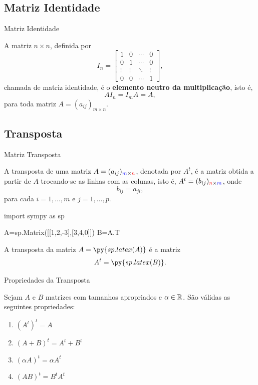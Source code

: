 \subsection*{Matriz Identidade}
\begin{frame}[label=matrizes]{Matriz Identidade}

A matriz $n\times n$, definida por
\[I_n=\begin{bmatrix}
1 & 0 & \cdots & 0\\
0 & 1 & \cdots & 0\\
\vdots & \vdots & \ddots & \vdots\\
0 & 0 & \cdots & 1
\end{bmatrix},\]
chamada de {\color{blue} matriz identidade}, é o \textbf{elemento neutro da multiplicação}, isto é, 
\[AI_n=I_mA=A,\]
para toda matriz $A=(a_{ij})_{m\times n}$.
\end{frame}

\subsection*{Transposta}
\begin{frame}[label=matrizes,fragile=singleslide]{Matriz Transposta}

A {\color{blue} transposta} de uma matriz $A=(a_{ij})_{{\color{blue}m}\times {\color{red}n}}$, denotada por $A^t$,  é a matriz obtida a partir de $A$ trocando-se as linhas com as colunas, isto é,  $A^t=(b_{ij})_{{\color{red}n}\times {\color{blue}m}}$, onde
\[b_{ij}=a_{ji},\]
para cada $i=1,\ldots,m$ e $j=1,\ldots,p$.


\begin{pycode}
import sympy as sp

A=sp.Matrix([[1,2,-3],[3,4,0]])
B=A.T
\end{pycode}

\begin{exe}
A transposta da matriz  $A=\py{sp.latex(A)} $ é a matriz 
\[A^t=\py{sp.latex(B)}.\]
\end{exe}

\end{frame}




\begin{frame}[label=matrizes]{Propriedades da Transposta}

Sejam $A$ e $B$ matrizes com tamanhos apropriados e $\alpha\in \mathbb{R}$. São válidas as seguintes propriedades:

\begin{enumerate}
\item $(A^t)^t=A$ 
\item $(A+B)^t=A^t+B^t$
\item $(\alpha A)^t=\alpha A^t$
\item $(AB)^t=B^tA^t$
\end{enumerate}

\end{frame}

